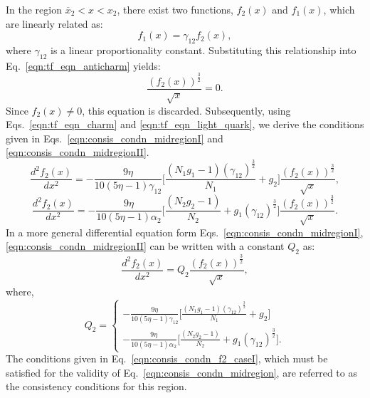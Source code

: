 \documentclass[preprint,12pt]{elsarticle}
\begin{document}
            In the region $\overline{x}_{2} < x < x_2$, there exist two functions, $f_2(x)$ and $f_1(x)$, which are linearly related as:  
            \[
            f_1(x) = \gamma_{12} f_2(x),
            \]  
            where $\gamma_{12}$ is a linear proportionality constant. Substituting this relationship into Eq.~\eqref{eqn:tf_eqn_anticharm} yields:  
            \[
            \frac{(f_2(x))^{\frac{3}{2}}}{\sqrt{x}} = 0.
            \]  
            Since $f_2(x) \neq 0$, this equation is discarded. Subsequently, using Eqs.~\eqref{eqn:tf_eqn_charm} and \eqref{eqn:tf_eqn_light_quark}, we derive the conditions given in Eqs.~\eqref{eqn:consis_condn_midregionI} and \eqref{eqn:consis_condn_midregionII}. 
            \begin{equation}
                  \frac{d^2 f_2(x)}{dx^2}= -\frac{9\eta}{10(5\eta-1)  \gamma_{12} }\biggl[\frac{(N_1 g_1-1)(\gamma_{12})^\frac{3}{2}}{N_1} + g_2 \biggr]\frac{\left( f_2(x) \right)^\frac{3}{2}}{\sqrt{x}},
                    \label{eqn:consis_condn_midregionI}
            \end{equation}
            \begin{equation}
                 \frac{d^2 f_2(x)}{dx^2}= - \frac{9\eta}{10(5\eta-1)\alpha_2}\biggl[\frac{(N_2 g_2-1)}{N_2} 
                 + g_1 (\gamma_{12})^\frac{3}{2} \biggr]\frac{\left( f_2(x) \right)^\frac{3}{2}}{\sqrt{x}}.
                 \label{eqn:consis_condn_midregionII}
            \end{equation}
            In a more general differential equation form Eqs.~\eqref{eqn:consis_condn_midregionI},  \eqref{eqn:consis_condn_midregionII} can be written with a constant $Q_2$ as: 
            \begin{equation}
                 \frac{d^2f_2(x)}{dx^2} = Q_2 \frac{\left(f_2(x)\right)^\frac{3}{2}}{\sqrt{x}},
                  \label{eqn:consis_condn_midregion}
            \end{equation}
            where, 
            \begin{equation}
            Q_2 = \left\{
                \begin{aligned}     
                    -\frac{9\eta}{10(5\eta-1)  \gamma_{12} }\biggl[\frac{(N_1 g_1-1)(\gamma_{12})^\frac{3}{2}}{N_1} + g_2 \biggr]\\ 
                    -\frac{9\eta}{10(5\eta-1)\alpha_2}\biggl[\frac{(N_2 g_2-1)}{N_2} 
                    + g_1 (\gamma_{12})^\frac{3}{2} \biggr].
                \end{aligned}
                \right. \label{eqn:consis_condn_f2_caseI}
            \end{equation}
            The conditions given in Eq.~\eqref{eqn:consis_condn_f2_caseI}, which must be satisfied for the validity of Eq.~\eqref{eqn:consis_condn_midregion}, are referred to as the consistency conditions for this region. 
\end{document}
